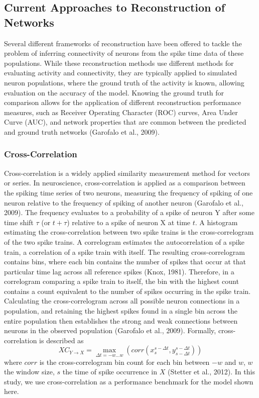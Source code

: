 \documentclass[11pt,titlepage]{article}
\begin{document}
\subsection{Current Approaches to Reconstruction of Networks}
Several different frameworks of reconstruction have been offered to tackle the problem of inferring connectivity of neurons from the spike time data of these populations. While these reconstruction methods use different methods for evaluating activity and connectivity, they are typically applied to simulated neuron populations, where the ground truth of the activity is known, allowing evaluation on the accuracy of the model. Knowing the ground truth for comparison allows for the application of different reconstruction performance measures, such as Receiver Operating Character (ROC) curves, Area Under Curve (AUC), and network properties that are common between the predicted and ground truth networks (Garofalo et al., 2009).\par

\subsubsection{Cross-Correlation}
Cross-correlation is a widely applied similarity measurement method for vectors or series. In neuroscience, cross-correlation is applied as a comparison between the spiking time series of two neurons, measuring the frequency of spiking of one neuron relative to the frequency of spiking of another neuron (Garofalo et al., 2009). The frequency evaluates to a probability of a spike of neuron Y after some time shift $\tau$ (or $t + \tau$) relative to a spike of neuron X at time $t$. A histogram estimating the cross-correlation between two spike trains is the cross-correlogram of the two spike trains. A correlogram estimates the autocorrelation of a spike train, a correlation of a spike train with itself. The resulting cross-correlogram contains bins, where each bin contains the number of spikes that occur at that particular time lag across all reference spikes (Knox, 1981). Therefore, in a correlogram comparing a spike train to itself, the bin with the highest count contains a count equivalent to the number of spikes occurring in the spike train. Calculating the cross-correlogram across all possible neuron connections in a population, and retaining the highest spikes found in a single bin across the entire population then establishes the strong and weak connections between neurons in the observed population (Garofalo et al., 2009). Formally, cross-correlation is described as
$$XC_{Y \rightarrow X} = \max_{\Delta t = -w ... w} (corr(x_s^{s-\Delta t},y_{s-\Delta t}^{s-\Delta t} ))$$
where $corr$ is the cross-correlogram bin count for each bin between $-w$ and $w$, $w$ the window size, $s$ the time of spike occurrence in $X$ (Stetter et al., 2012). In this study, we use cross-correlation as a performance benchmark for the model shown here.
\end{document}
